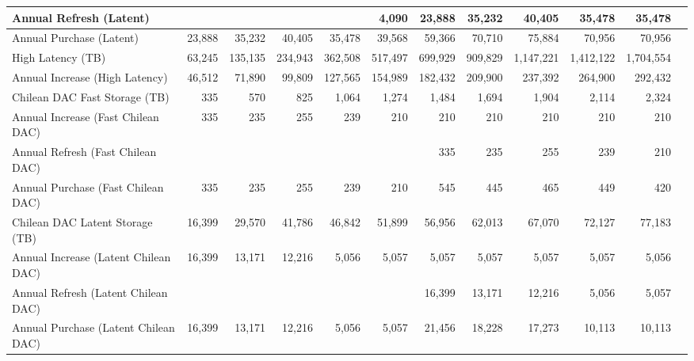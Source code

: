 \begin{longtable} { |p{}  |r  |r  |r  |r  |r  |r  |r  |r  |r  |r  |r |}
{Annual Refresh (Latent)}&{}&{}&{}&{}&{4,090}&{23,888}&{35,232}&{40,405}&{35,478}&{35,478} \\ \hline
{Annual Purchase (Latent)}&{23,888}&{35,232}&{40,405}&{35,478}&{39,568}&{59,366}&{70,710}&{75,884}&{70,956}&{70,956} \\ \hline
{High Latency (TB)}&{63,245}&{135,135}&{234,943}&{362,508}&{517,497}&{699,929}&{909,829}&{1,147,221}&{1,412,122}&{1,704,554} \\ \hline
{Annual Increase (High Latency)}&{46,512}&{71,890}&{99,809}&{127,565}&{154,989}&{182,432}&{209,900}&{237,392}&{264,900}&{292,432} \\ \hline
{Chilean DAC Fast Storage (TB)}&{335}&{570}&{825}&{1,064}&{1,274}&{1,484}&{1,694}&{1,904}&{2,114}&{2,324} \\ \hline
{Annual Increase (Fast Chilean DAC)}&{335}&{235}&{255}&{239}&{210}&{210}&{210}&{210}&{210}&{210} \\ \hline
{Annual Refresh (Fast Chilean DAC)}&{}&{}&{}&{}&{}&{335}&{235}&{255}&{239}&{210} \\ \hline
{Annual Purchase (Fast Chilean DAC)}&{335}&{235}&{255}&{239}&{210}&{545}&{445}&{465}&{449}&{420} \\ \hline
{Chilean DAC Latent Storage (TB)}&{16,399}&{29,570}&{41,786}&{46,842}&{51,899}&{56,956}&{62,013}&{67,070}&{72,127}&{77,183} \\ \hline
{Annual Increase (Latent Chilean DAC)}&{16,399}&{13,171}&{12,216}&{5,056}&{5,057}&{5,057}&{5,057}&{5,057}&{5,057}&{5,056} \\ \hline
{Annual Refresh (Latent Chilean DAC)}&{}&{}&{}&{}&{}&{16,399}&{13,171}&{12,216}&{5,056}&{5,057} \\ \hline
{Annual Purchase (Latent Chilean DAC)}&{16,399}&{13,171}&{12,216}&{5,056}&{5,057}&{21,456}&{18,228}&{17,273}&{10,113}&{10,113} \\ \hline
\end{longtable} \normalsize
